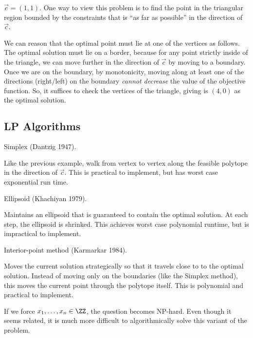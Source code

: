 $\Vec{c} = (1,1)$. One way to view this problem is to find the point in the triangular region bounded by the constraints that is ``as far as possible'' in the direction of $\Vec{c}$. 

We can reason that the optimal point must lie at one of the vertices as follows. The optimal solution must lie on a border, because for any point strictly inside of the triangle, we can move further in the direction of $\Vec{c}$ by moving to a boundary. Once we are on the boundary, by monotonicity, moving along at least one of the directions (right/left) on the boundary \textit{cannot decrease} the value of the objective function. So, it suffices to check the vertices of the triangle, giving is $(4,0)$ as the optimal solution.  

\subsection{LP Algorithms}

\begin{example}
\exlabel

Simplex (Dantzig 1947).
\end{example}

Like the previous example, walk from vertex to vertex along the feasible polytope in the direction of $\Vec{c}$. This is practical to implement, but has worst case exponential run time.

\begin{example}
\exlabel

Ellipsoid (Khachiyan 1979). 
\end{example}

Maintains an ellipsoid that is guaranteed to contain the optimal solution. At each step, the ellipsoid is shrinked. This achieves worst case polynomial runtime, but is impractical to implement. 

\begin{example}
\exlabel

Interior-point method (Karmarkar 1984).
\end{example}

Moves the current solution strategically so that it travels close to to the optimal solution. Instead of moving only on the boundaries (like the Simplex method), this moves the current point through the polytope itself. This is polynomial and practical to implement. 

\begin{misconception}
\warninglabel

If we force $x_1, \hdots, x_n\in \ZZ$, the question becomes NP-hard. Even though it seems related, it is much more difficult to algorithmically solve this variant of the problem. 
\end{misconception}

